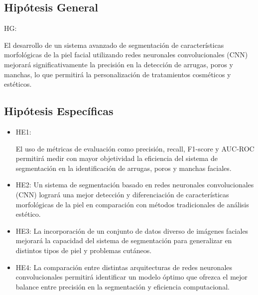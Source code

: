 \subsection{Hipótesis General}
HG: \newcommand{\HipotesisGeneral}{
	El desarrollo de un sistema avanzado de segmentación de características morfológicas de la piel facial utilizando redes neuronales convolucionales (CNN) mejorará significativamente la precisión en la detección de arrugas, poros y manchas, lo que permitirá la personalización de tratamientos cosméticos y estéticos.
}
\HipotesisGeneral


\subsection{Hipótesis Específicas}
\newcommand{\Hone}{

El uso de métricas de evaluación como precisión, recall, F1-score y AUC-ROC permitirá medir con mayor objetividad la eficiencia del sistema de segmentación en la identificación de arrugas, poros y manchas faciales.
}
\newcommand{\Htwo}{
Un sistema de segmentación basado en redes neuronales convolucionales (CNN) logrará una mejor detección y diferenciación de características morfológicas de la piel en comparación con métodos tradicionales de análisis estético.
}
\newcommand{\Hthree}{
La incorporación de un conjunto de datos diverso de imágenes faciales mejorará la capacidad del sistema de segmentación para generalizar en distintos tipos de piel y problemas cutáneos.
}
\newcommand{\Hfour}{
La comparación entre distintas arquitecturas de redes neuronales convolucionales permitirá identificar un modelo óptimo que ofrezca el mejor balance entre precisión en la segmentación y eficiencia computacional.
}

\begin{itemize}
	\item HE1: {\Hone}
	\item HE2: {\Htwo}
	\item HE3: {\Hthree}
	\item HE4: {\Hfour}
\end{itemize}